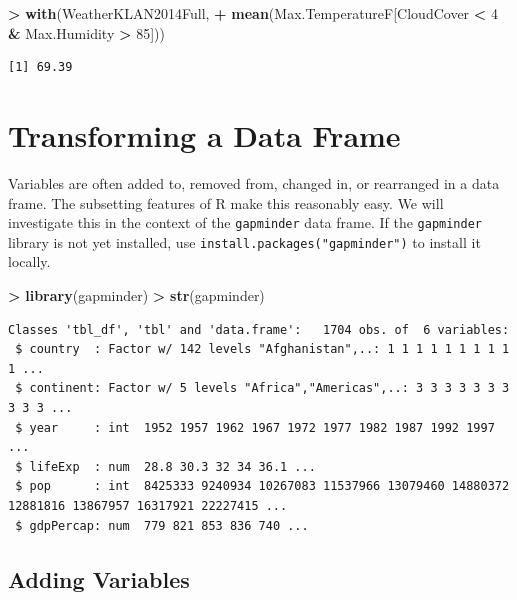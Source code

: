 \documentclass[]{krantz}
\makeatletter
\newenvironment{Shaded}{\begin{snugshade}}{\end{snugshade}}
\newcommand{\KeywordTok}[1]{\textcolor[rgb]{0.27,0.27,0.27}{\textbf{#1}}}
\newcommand{\DecValTok}[1]{\textcolor[rgb]{0.06,0.06,0.06}{#1}}
\newcommand{\StringTok}[1]{\textcolor[rgb]{0.5,0.5,0.5}{#1}}
\newcommand{\OperatorTok}[1]{\textcolor[rgb]{0.43,0.43,0.43}{\textbf{#1}}}
\newcommand{\NormalTok}[1]{#1}
\newenvironment{kframe}{%
\medskip{}
\setlength{\fboxsep}{.8em}
 \def\at@end@of@kframe{}%
 \ifinner\ifhmode%
  \def\at@end@of@kframe{\end{minipage}}%
  \begin{minipage}{\columnwidth}%
 \fi\fi%
 \def\FrameCommand##1{\hskip\@totalleftmargin \hskip-\fboxsep
 \colorbox{shadecolor}{##1}\hskip-\fboxsep
     \hskip-\linewidth \hskip-\@totalleftmargin \hskip\columnwidth}%
 \MakeFramed {\advance\hsize-\width
   \@totalleftmargin\z@ \linewidth\hsize
   \@setminipage}}%
 {\par\unskip\endMakeFramed%
 \at@end@of@kframe}
\renewenvironment{Shaded}{\begin{kframe}}{\end{kframe}}
\makeatother
\begin{document}
\begin{Shaded}
\begin{Highlighting}[]
\OperatorTok{>}\StringTok{ }\KeywordTok{with}\NormalTok{(WeatherKLAN2014Full, }
\OperatorTok{+}\StringTok{      }\KeywordTok{mean}\NormalTok{(Max.TemperatureF[CloudCover }\OperatorTok{<}\StringTok{ }\DecValTok{4} \OperatorTok{&}\StringTok{ }\NormalTok{Max.Humidity }\OperatorTok{>}\StringTok{ }\DecValTok{85}\NormalTok{]))}
\end{Highlighting}
\end{Shaded}

\begin{verbatim}
[1] 69.39
\end{verbatim}

\section{Transforming a Data Frame}\label{transforming-a-data-frame}

Variables are often added to, removed from, changed in, or rearranged in
a data frame. The subsetting features of R make this reasonably easy. We
will investigate this in the context of the \texttt{gapminder} data
frame. If the \texttt{gapminder} library is not yet installed, use
\texttt{install.packages("gapminder")} to install it locally.

\begin{Shaded}
\begin{Highlighting}[]
\OperatorTok{>}\StringTok{ }\KeywordTok{library}\NormalTok{(gapminder)}
\OperatorTok{>}\StringTok{ }\KeywordTok{str}\NormalTok{(gapminder)}
\end{Highlighting}
\end{Shaded}

\begin{verbatim}
Classes 'tbl_df', 'tbl' and 'data.frame':   1704 obs. of  6 variables:
 $ country  : Factor w/ 142 levels "Afghanistan",..: 1 1 1 1 1 1 1 1 1 1 ...
 $ continent: Factor w/ 5 levels "Africa","Americas",..: 3 3 3 3 3 3 3 3 3 3 ...
 $ year     : int  1952 1957 1962 1967 1972 1977 1982 1987 1992 1997 ...
 $ lifeExp  : num  28.8 30.3 32 34 36.1 ...
 $ pop      : int  8425333 9240934 10267083 11537966 13079460 14880372 12881816 13867957 16317921 22227415 ...
 $ gdpPercap: num  779 821 853 836 740 ...
\end{verbatim}

\subsection{Adding Variables}\label{adding-variables}
\end{document}
